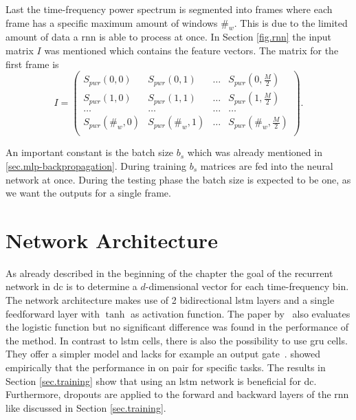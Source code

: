 Last the time-frequency power spectrum is segmented into frames where each frame has a specific maximum amount of windows $\#_w$. This is due to the limited amount of data a \gls{rnn} is able to process at once. In Section \ref{fig.rnn} the input matrix $I$ was mentioned which contains the feature vectors. The matrix for the first frame is
\begin{equation*}
	I=
	\begin{pmatrix}
		S_{pwr}(0, 0)    & S_{pwr}(0, 1)    & \ldots & S_{pwr}(0, \frac{M}{2})    \\
		S_{pwr}(1, 0)    & S_{pwr}(1, 1)    & \ldots & S_{pwr}(1, \frac{M}{2})    \\
		\ldots           & \ldots           & \ldots & \ldots                     \\
		S_{pwr}(\#_w, 0) & S_{pwr}(\#_w, 1) & \ldots & S_{pwr}(\#_w, \frac{M}{2}) \\
	\end{pmatrix}.
	\label{eq.input-for-network}
\end{equation*}

An important constant is the batch size $b_s$ which was already mentioned in \ref{sec.mlp-backpropagation}. During training $b_s$ matrices are fed into the neural network at once. During the testing phase the batch size is expected to be one, as we want the outputs for a single frame.

\section{Network Architecture}\label{sec.architecture}

As already described in the beginning of the chapter the goal of the recurrent network in \gls{dc} is to determine a $d$-dimensional vector for each time-frequency bin.
The network architecture makes use of 2 bidirectional \gls{lstm} layers and a single feedforward layer with $\tanh$ as activation function. The paper by~\textcite[p.~33]{Hershey2016} also evaluates the logistic function but no significant difference was found in the performance of the method.
In contrast to \gls{lstm} cells, there is also the possibility to use \gls{gru} cells. They offer a simpler model and lacks for example an output gate~\cite{Chung2014}. \textcite{Chung2014} showed empirically that the performance in on pair for specific tasks. The results in Section \ref{sec.training} show that using an \gls{lstm} network is beneficial for \gls{dc}.
Furthermore, dropouts are applied to the forward and backward layers of the \gls{rnn} like discussed in Section \ref{sec.training}.

